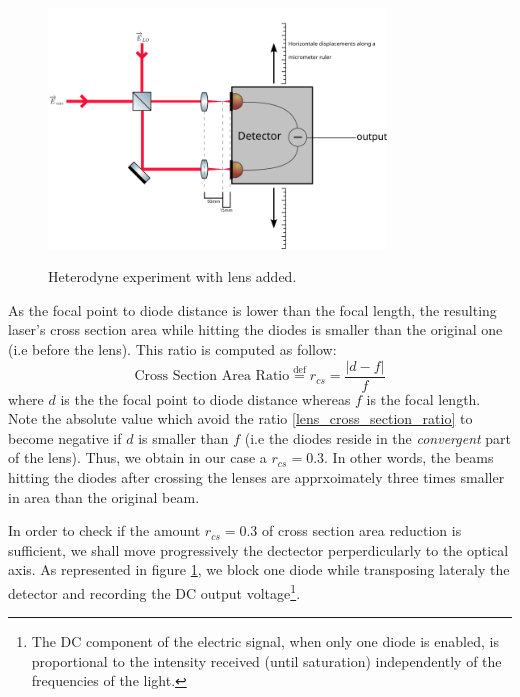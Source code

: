 \documentclass[10pt]{report}
\begin{document}
\begin{figure}[h!]
\caption{Heterodyne experiment with lens added.}
\centering
\includegraphics[width=0.8\textwidth]{heterodyne-lens}
\label{fig:heterodyne-lens}
\end{figure}

As the focal point to diode distance is lower than the focal length, the resulting laser's cross section area while hitting the diodes is smaller than the original one (i.e before the lens). This ratio is computed as follow:
\begin{equation}
\label{lens_cross_section_ratio}
\textrm{Cross Section Area Ratio} \stackrel{\text{def}}{=} r_{cs} = \frac{\vert d-f \vert}{f}
\end{equation}
where $d$ is the the focal point to diode distance whereas $f$ is the focal length. Note the absolute value which avoid the ratio \eqref{lens_cross_section_ratio} to become negative if $d$ is smaller than $f$ (i.e the diodes reside in the \textit{convergent} part of the lens). Thus, we obtain in our case a $r_{cs} = 0.3$. In other words, the beams hitting the diodes after crossing the lenses are apprxoimately three times smaller in area than the original beam.

In order to check if the amount $r_{cs} = 0.3$ of cross section area reduction is sufficient, we shall move progressively the dectector perperdicularly to the optical axis. As represented in figure \ref{fig:heterodyne-lens}, we block one diode while transposing lateraly the detector and recording the DC output voltage\footnote{The DC component of the electric signal, when only one diode is enabled, is proportional to the intensity received (until saturation) independently of the frequencies of the light. }.
\end{document}
